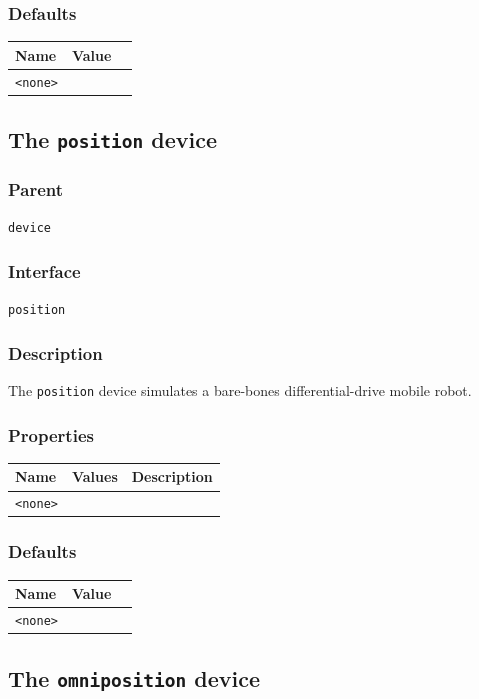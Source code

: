 \documentclass[11pt,twoside]{report}
\begin{document}
\subsubsection*{Defaults}
\begin{tabularx}{\columnwidth}{llX}
\hline
Name & Value\\
\hline
\verb'<none>'\\
\hline
\end{tabularx}



\newpage
\subsection{The {\tt position} device}

\subsubsection*{Parent}
{\tt device}

\subsubsection*{Interface}
{\tt position}

\subsubsection*{Description}
The {\tt position} device simulates a bare-bones differential-drive
mobile robot. 

\subsubsection*{Properties}
\begin{tabularx}{\columnwidth}{llX}
\hline
Name & Values & Description \\
\hline
\verb'<none>'\\
\hline
\end{tabularx}

\subsubsection*{Defaults}
\begin{tabularx}{\columnwidth}{llX}
\hline
Name & Value\\
\hline
\verb'<none>'\\
\hline
\end{tabularx}

\newpage
\subsection{The {\tt omniposition} device}
\end{document}
